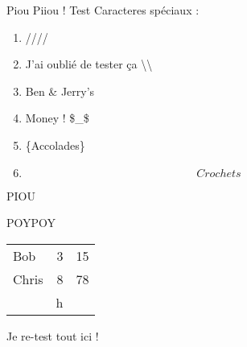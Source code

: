 
Piou Piiou !
Test Caracteres spéciaux :
\begin{enumerate}
\item \backslasho/\backslasho/\backslasho/\backslasho/
\item J'ai oublié de tester ça \backslash\backslash
\item Ben \& Jerry's
\item Money ! \$_\$
$$ $$ $$$$$$$$$$$$
\item \{Accolades\}
\item \[Crochets\]
\end{enumerate}

\begin{itemize}
\itemPIOU PIOU
\begin{enumerate}
\end{enumerate}
\itemPILPIL
\end{itemize}
POYPOY
\begin{enumerate}
\end{enumerate}
\begin{tabular}{lrc}
Bob & 3 & 15 \\
Chris & 8 & 78 \\
 & h \\
\end{tabular}
Je re-test tout ici !

